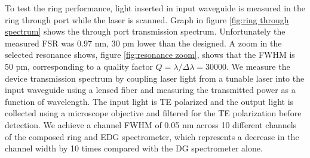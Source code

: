 \documentclass[12pt,twoside,english]{book}
\renewcommand{\~}{\perispomeni}%
\numberwithin{equation}{section}
\numberwithin{figure}{section}
\begin{document}
To test the ring performance, light inserted in input waveguide is measured in the ring through port while the laser is scanned. Graph in figure \ref{fig:ring through spectrum} shows the through port transmission spectrum. Unfortunately the measured FSR was 0.97 nm, 30 pm lower than the designed. A zoom in the selected resonance shows, figure \ref{fig:resonance zoom}, shows that the FWHM is 50 pm, corresponding to a quality factor $Q=\lambda/\Delta\lambda=30000$. 
We measure the device transmission spectrum by coupling laser light from a tunable laser into the input waveguide using a lensed fiber and measuring the transmitted power as a function of wavelength. The input light is TE polarized and the output light is collected using a microscope objective and filtered for the TE polarization before detection. We achieve a channel \gls{FWHM} of 0.05 nm across 10 different channels of the composed ring and EDG spectrometer, which represents a decrease in the channel width by 10 times compared with the DG spectrometer alone. 
\end{document}
